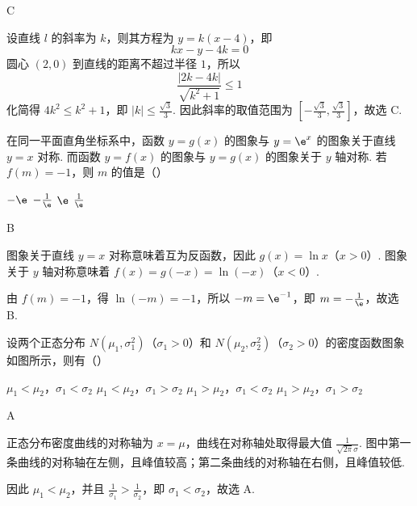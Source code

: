 \begin{answer}
C
\end{answer}

\begin{solution}
设直线 \(l\) 的斜率为 \(k\)，则其方程为 \(y=k(x-4)\)，即
\[
kx-y-4k=0
\]
圆心 \((2,0)\) 到直线的距离不超过半径 \(1\)，所以
\[
\frac{|2k-4k|}{\sqrt{k^2+1}}\leqslant1
\]
化简得 \(4k^2\leqslant k^2+1\)，即 \(|k|\leqslant\frac{\sqrt{3}}{3}\). 因此斜率的取值范围为 \(\left[-\frac{\sqrt{3}}{3},\frac{\sqrt{3}}{3}\right]\)，故选 C.
\end{solution}

\begin{problem}
在同一平面直角坐标系中，函数 \( y = g(x) \) 的图象与 \( y = \e^{x} \) 的图象关于直线 \( y = x \) 对称. 而函数 \( y = f(x) \) 的图象与 \( y = g(x) \) 的图象关于 \( y \) 轴对称. 若 \( f(m) = -1 \)，则 \( m \) 的值是（\quad）

\choices
    {\(-\e\)}
    {\(-\frac{1}{\e}\)}
    {\(\e\)}
    {\(\frac{1}{\e}\)}
\end{problem}

\begin{answer}
B
\end{answer}

\begin{solution}
图象关于直线 \(y=x\) 对称意味着互为反函数，因此 \(g(x)=\ln x\)（\(x>0\)）. 图象关于 \(y\) 轴对称意味着 \(f(x)=g(-x)=\ln(-x)\)（\(x<0\)）.

由 \(f(m)=-1\)，得 \(\ln(-m)=-1\)，所以 \(-m=\e^{-1}\)，即 \(m=-\frac{1}{\e}\)，故选 B.
\end{solution}

\begin{problem}
设两个正态分布 \(N(\mu_1, \sigma_1^2)\)（\(\sigma_1 > 0\)）和 \(N(\mu_2, \sigma_2^2)\)（\(\sigma_2 > 0\)）的密度函数图象如图所示，则有（\quad）


\choices
    {\(\mu_{1} < \mu_{2}\)，\(\sigma_{1} < \sigma_{2}\)}
    {\(\mu_{1} < \mu_{2}\)，\(\sigma_{1} > \sigma_{2}\)}
    {\(\mu_{1} > \mu_{2}\)，\(\sigma_{1} < \sigma_{2}\)}
    {\(\mu_{1} > \mu_{2}\)，\(\sigma_{1} > \sigma_{2}\)}
\end{problem}

\begin{answer}
A
\end{answer}

\begin{solution}
正态分布密度曲线的对称轴为 \(x=\mu\)，曲线在对称轴处取得最大值 \(\frac{1}{\sqrt{2\pi}\sigma}\). 图中第一条曲线的对称轴在左侧，且峰值较高；第二条曲线的对称轴在右侧，且峰值较低.

因此 \(\mu_1<\mu_2\)，并且 \(\frac{1}{\sigma_1}>\frac{1}{\sigma_2}\)，即 \(\sigma_1<\sigma_2\)，故选 A.
\end{solution}

